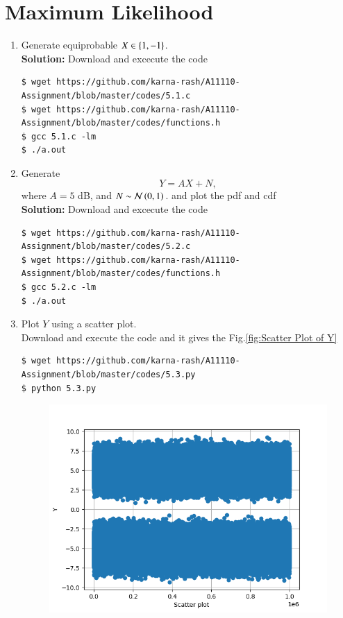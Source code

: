 \documentclass[journal,12pt,twocolumn]{IEEEtran}
\renewcommand\thesection{\arabic{section}}
\begin{document}
\section{Maximum Likelihood}
\begin{enumerate}[label=\thesection.\arabic*
,ref=\thesection.\theenumi]
\item Generate equiprobable $X \in \left\{1,-1\right\}$.\\
\textbf{Solution:}
	Download and excecute the code
	\begin{lstlisting}
$ wget https://github.com/karna-rash/A11110-Assignment/blob/master/codes/5.1.c
$ wget https://github.com/karna-rash/A11110-Assignment/blob/master/codes/functions.h
$ gcc 5.1.c -lm 
$ ./a.out 
	\end{lstlisting}
\item Generate 
\begin{equation}
Y = AX+N,
\end{equation}
		where $A = 5$ dB,  and $N \sim \mathcal{N}\left(0,1\right)$. and plot the pdf and cdf\\ 
		\textbf{Solution:}
	Download and excecute the code
	\begin{lstlisting}
$ wget https://github.com/karna-rash/A11110-Assignment/blob/master/codes/5.2.c
$ wget https://github.com/karna-rash/A11110-Assignment/blob/master/codes/functions.h
$ gcc 5.2.c -lm 
$ ./a.out 
	\end{lstlisting}
	\item Plot $Y$ using a scatter plot.\\
	\solution
	Download and execute the code and it gives the Fig.\ref{fig:Scatter Plot of Y}
	\begin{lstlisting}
$ wget https://github.com/karna-rash/A11110-Assignment/blob/master/codes/5.3.py
$ python 5.3.py
	\end{lstlisting}
	\begin{figure}
\centering
\includegraphics[width=\columnwidth]{./figs/scatter_plot.png}

\end{figure}
\end{enumerate}
\end{document}
